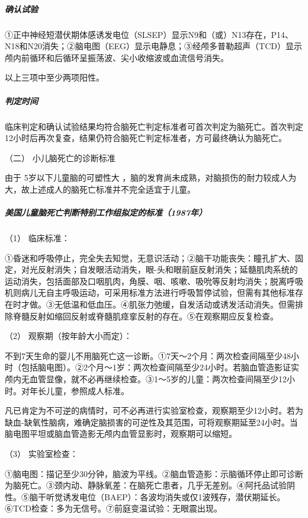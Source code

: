 \subparagraph{确认试验}

①正中神经短潜伏期体感诱发电位（SLSEP）显示N9和（或）N13存在，P14、N18和N20消失；②脑电图（EEG）显示电静息；③经颅多普勒超声（TCD）显示颅内前循环和后循环呈振荡波、尖小收缩波或血流信号消失。

以上三项中至少两项阳性。

\subparagraph{判定时间}

临床判定和确认试验结果均符合脑死亡判定标准者可首次判定为脑死亡。首次判定12小时后再次复查，结果仍符合脑死亡判定标准者，方可最终确认为脑死亡。

\hypertarget{text00067.htmlux5cux23CHP3-1-2-5-2}{}
（二） 小儿脑死亡的诊断标准

由于 5岁以下儿童脑的可塑性大
，脑的发育尚未成熟，对脑损伤的耐力较成人为大，故上述成人的脑死亡标准并不完全适宜于儿童。

\subparagraph{美国儿童脑死亡判断特别工作组拟定的标准（1987年）}

\hypertarget{text00067.htmlux5cux23CHP3-1-2-5-2-1-1}{}
（1） 临床标准：

①昏迷和呼吸停止，完全失去知觉，无意识活动；②脑干功能丧失：瞳孔扩大、固定，对光反射消失；自发眼活动消失，眼-头和眼前庭反射消失；延髓肌肉系统的运动消失，包括面部及口咽肌肉，角膜、咽、咳嗽、吸吮等反射均消失；脱离呼吸机则病儿无自主呼吸运动，可采用标准方法进行呼吸暂停试验，但需有其他标准存在时才做。③无低温和低血压。④肌张力弛缓，自发活动或诱发活动消失。但需排除脊髓反射如缩回反射或脊髓肌痉挛反射的存在。⑤在观察期应反复检查。

\hypertarget{text00067.htmlux5cux23CHP3-1-2-5-2-1-2}{}
（2） 观察期（按年龄大小而定）：

不到7天生命的婴儿不用脑死亡这一诊断。①7天～2个月：两次检查间隔至少48小时（包括脑电图）。②2个月～1岁：两次检查间隔至少24小时。若脑血管造影证实颅内无血管显像，就不必再继续检查。③1～5岁的儿童：两次检查间隔至少12小时。对年长儿童，参照成人标准。

凡已肯定为不可逆的病情时，可不必再进行实验室检查，观察期至少12小时。若为缺血-缺氧性脑病，难确定脑损害的可逆性及其范围，可将观察期延至24小时。当脑电图平坦或脑血管造影无颅内血管显影时，观察期可以缩短。

\hypertarget{text00067.htmlux5cux23CHP3-1-2-5-2-1-3}{}
（3） 实验室检查：

①脑电图：描记至少30分钟，脑波为平线。②脑血管造影：示脑循环停止即可诊断为脑死亡。③颈内动、静脉氧差：在脑死亡患者，几乎无差别。④阿托品试验阴性。⑤脑干听觉诱发电位（BAEP）：各波均消失或仅1波残存，潜伏期延长。⑥TCD检查：多为无信号。⑦前庭变温试验：无眼震出现。


